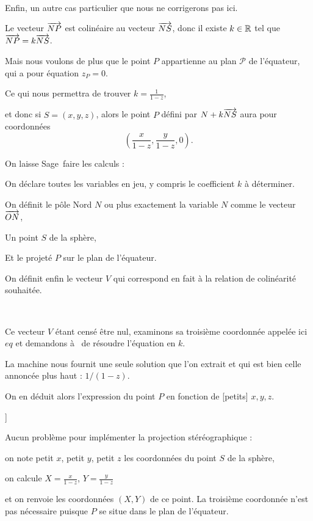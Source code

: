 ~

Enfin, un autre cas particulier que nous ne corrigerons pas ici.


\diapo

Le vecteur $\overrightarrow{NP}$ est colinéaire au vecteur $\overrightarrow{NS}$, donc il existe
$k\in \mathbb{R}$ tel que  $\overrightarrow{NP} = k \overrightarrow{NS}$.


\change
Mais nous voulons de plus que le point $P$ appartienne au plan $\mathcal{P}$ de l'équateur, qui a pour équation $z_P = 0$.


\change
Ce qui nous permettra de trouver $k = \frac{1}{1-z}$,

\change
et donc si $S=(x,y,z)$, alors le point $P$ défini par $N + k\overrightarrow{NS}$ aura pour coordonnées 
$$\left( \frac{x}{1-z}, \frac{y}{1-z}, 0 \right).$$
   
\change

On laisse Sage\ faire les calculs :

On déclare toutes les variables en jeu, y compris le coefficient $k$ à déterminer.

On définit le pôle Nord $N$ ou plus exactement la variable $N$ comme le vecteur $\overrightarrow{ON}$,

Un point $S$ de la sphère,

Et le projeté $P$ sur le plan de l'équateur.

On définit enfin le vecteur $V$ qui correspond en fait à la relation de colinéarité souhaitée.

~

Ce vecteur $V$ étant censé être nul, examinons sa troisième coordonnée appelée ici $eq$ et demandons à \Sage\ de résoudre l'équation en $k$.

La machine nous fournit une seule solution que l'on extrait et qui est bien celle annoncée plus haut : $1/(1-z)$.

On en déduit alors l'expression du point $P$ en fonction de [petits] $x,y,z$.   
 

\diapo
[[grand X,Y, petit x,y,z]]

Aucun problème pour implémenter la projection stéréographique : 

on note petit $x$, petit $y$, petit $z$ les coordonnées du point $S$ de la sphère,

on calcule $X = \frac{x}{1-z}$, $Y = \frac{y}{1-z}$

et on renvoie les coordonnées $(X,Y)$ de ce point. La troisième coordonnée n'est pas nécessaire puisque $P$ se situe dans le plan de l'équateur.

